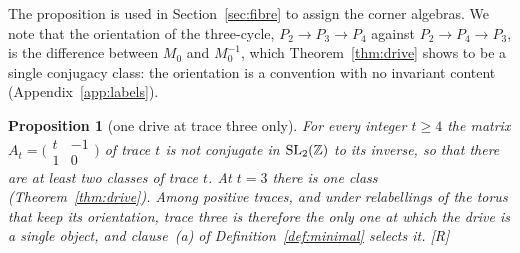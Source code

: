 \documentclass[11pt,a4paper]{article}
\theoremstyle{plain}
\newtheorem{proposition}[theorem]{Proposition}
\theoremstyle{definition}
\theoremstyle{remark}
\newcommand{\rigR}{[\textup{R}]}
\begin{document}
The proposition is used in Section~\ref{sec:fibre} to assign the corner algebras. We note that the orientation of the three-cycle, $P_{2}\to P_{3}\to P_{4}$ against $P_{2}\to P_{4}\to P_{3}$, is the difference between $M_{0}$ and $M_{0}^{-1}$, which Theorem~\ref{thm:drive} shows to be a single conjugacy class: the orientation is a convention with no invariant content (Appendix~\ref{app:labels}).

\begin{proposition}[one drive at trace three only]\label{prop:onedrive}
For every integer $t\geq4$ the matrix $A_{t}=\bigl(\begin{smallmatrix}t&-1\\1&0\end{smallmatrix}\bigr)$ of trace $t$ is not conjugate in $\mathrm{SL}_{2}(\mathbb{Z})$ to its inverse, so that there are at least two classes of trace $t$. At $t=3$ there is one class (Theorem~\ref{thm:drive}). Among positive traces, and under relabellings of the torus that keep its orientation, trace three is therefore the only one at which the drive is a single object, and clause~(a) of Definition~\ref{def:minimal} selects it. \rigR
\end{proposition}
\end{document}
